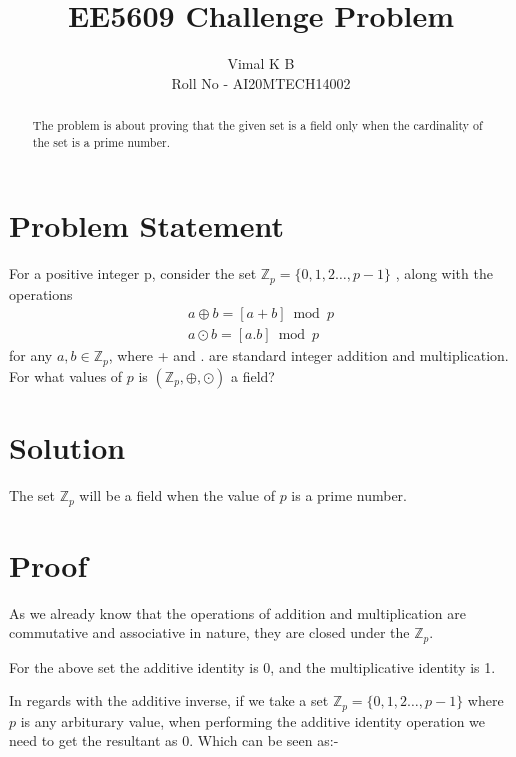 \documentclass[journal,12pt,twocolumn]{IEEEtran}
\begin{document}
\title{EE5609 Challenge Problem}
\author{Vimal K B \\Roll No - AI20MTECH14002}

\maketitle
\newpage
\bigskip

\renewcommand{\thefigure}{\theenumi}
\renewcommand{\thetable}{\theenumi}

\begin{abstract}
	The problem is about proving that the given set is a field only when the cardinality of the set is a prime number.
\end{abstract}

\section{\textbf{Problem Statement}}
	For a positive integer p, consider the set $\mathbb{Z}_p=\{0,1,2\ldots,p-1 \}$
	, along with the operations
	\begin{align}\label{eq1}
		a\oplus b = [a+b]\bmod p \\
		a\odot b = [a.b]\bmod p		
	\end{align}
for any $a,b\in \mathbb{Z}_p$, where + and . are standard integer addition and multiplication.
For what values of $p$ is $(\mathbb{Z}_p,\oplus,\odot)$ a field?
\section{\textbf{Solution}}

	The set $\mathbb{Z}_p$ will be a field when the value of $p$ is a prime number.
	
\section{\textbf{Proof}}

As we already know that the operations of addition and multiplication  are commutative and associative in nature, they are closed under the  $\mathbb{Z}_p$.

For the above set the additive identity is 0, and the multiplicative identity is 1.

In regards with the additive inverse, if we take a set $\mathbb{Z}_p=\{0,1,2\ldots,p-1 \}$ where $p$ is any arbiturary value, when performing the additive identity operation we need to get the resultant as 0. Which can be seen as:-
\end{document}
